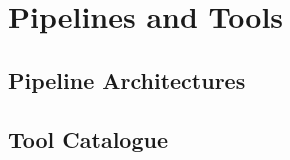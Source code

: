 %
%
%

\section{Pipelines and Tools}
\label{sec:pipelines}

\subsection{Pipeline Architectures}
\label{sec:pipeline_architectures}

%
%
%
%
%

\subsection{Tool Catalogue}
\label{sec:tools}

%


